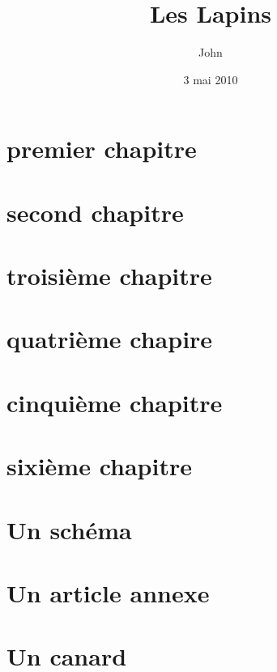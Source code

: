 \documentclass[a4paper]{report}
\title{Les Lapins}
\author{John \bsc{Doe}}
\date{3 mai 2010}
\begin{document}
\maketitle

\chapter{premier chapitre}
\chapter{second chapitre}
\chapter{troisième chapitre}
\chapter{quatrième chapire}
\chapter{cinquième chapitre}
\chapter{sixième chapitre}
\appendix
\chapter{Un schéma}
\chapter{Un article annexe}
\chapter{Un canard}
\end{document}
